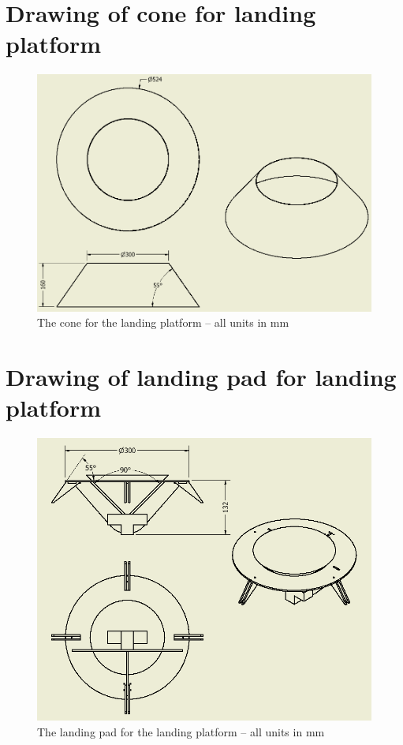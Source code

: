 
\section{Drawing of cone for landing platform}
\begin{figure}[H]
	\centering
	\includegraphics[width=1\textwidth]{imgs/app1_cone_drawing}
	\caption{The cone for the landing platform -- all units in \si{\milli\meter}}
\end{figure}
\section{Drawing of landing pad for landing platform}
\begin{figure}[H]
	\centering
	\includegraphics[width=1\textwidth]{imgs/app2_landing_pad_drawing}
	\caption{The landing pad for the landing platform -- all units in \si{\milli\meter}}
\end{figure}
